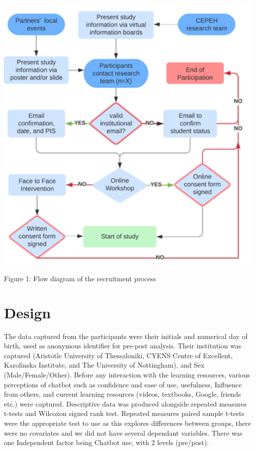 \documentclass[a4paper, nobind]{templates/ociamthesis}
\begin{document}
\includegraphics[width=5.76in]{untitled-1}

Figure 1: Flow diagram of the recruitment process

\hypertarget{design}{%
\section{Design}\label{design}}

The data captured from the participants were their initials and numerical day of birth, used as anonymous identifier for pre-post analysis. Their institution was captured (Aristotle University of Thessaloniki, CYENS Centre of Excellent, Karolinska Institute, and The University of Nottingham), and Sex (Male/Female/Other). Before any interaction with the learning resources, various perceptions of chatbot such as confidence and ease of use, usefulness, Influence from others, and current learning resources (videos, textbooks, Google, friends etc.) were captured. Descriptive data was produced alongside repeated measures t-tests and Wilcoxon signed rank test. Repeated measures paired sample t-tests were the appropriate test to use as this explores differences between groups, there were no covariates and we did not have several dependant variables. There was one Independent factor being Chatbot use, with 2 levels (pre/post).
\end{document}
